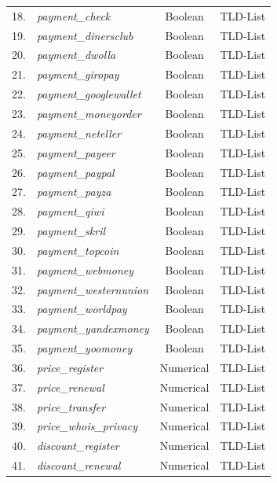 \documentclass[11pt]{article}
\begin{document}
\begin{table}[htbp]
{\begin{tabular}{llcc}
            18. & \textit{payment\_check} & Boolean & TLD-List \\
            19. & \textit{payment\_dinersclub} & Boolean & TLD-List \\
            20. & \textit{payment\_dwolla} & Boolean & TLD-List \\
            21. & \textit{payment\_giropay} & Boolean & TLD-List \\
            22. & \textit{payment\_googlewallet} & Boolean & TLD-List \\
            23. & \textit{payment\_moneyorder} & Boolean & TLD-List \\
            24. & \textit{payment\_neteller} & Boolean & TLD-List \\
            25. & \textit{payment\_payeer} & Boolean & TLD-List \\
            26. & \textit{payment\_paypal} & Boolean & TLD-List \\
            27. & \textit{payment\_payza} & Boolean & TLD-List \\
            28. & \textit{payment\_qiwi} & Boolean & TLD-List \\
            29. & \textit{payment\_skril} & Boolean & TLD-List \\
            30. & \textit{payment\_topcoin} & Boolean & TLD-List \\
            31. & \textit{payment\_webmoney} & Boolean & TLD-List \\
            32. & \textit{payment\_westernunion} & Boolean & TLD-List \\
            33. & \textit{payment\_worldpay} & Boolean & TLD-List \\
            34. & \textit{payment\_yandexmoney} & Boolean & TLD-List \\
            35. & \textit{payment\_yoomoney} & Boolean & TLD-List \\
            36. & \textit{price\_register} & Numerical & TLD-List \\
            37. & \textit{price\_renewal} & Numerical & TLD-List \\
            38. & \textit{price\_transfer} & Numerical & TLD-List \\
            39. & \textit{price\_whois\_privacy} & Numerical & TLD-List \\
            40. & \textit{discount\_register} & Numerical & TLD-List \\
            41. & \textit{discount\_renewal} & Numerical & TLD-List \\

\end{tabular}}
\end{table}
\end{document}
